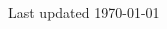 \documentclass[11pt]{article}
\newcommand{\job}[4]{
    \begingroup
        \textbf{\small#1}
        \hfill\color{black!70}\small{#3}
        \\
        \small#2
        \hfill\color{black!70}\small{#4}
    \endgroup
}
\begin{document}
\begin{paracol}{2}
{      %


      
    }

    \normaltext \hfill \tiny Last updated \today

    \end{paracol}
\end{document}
